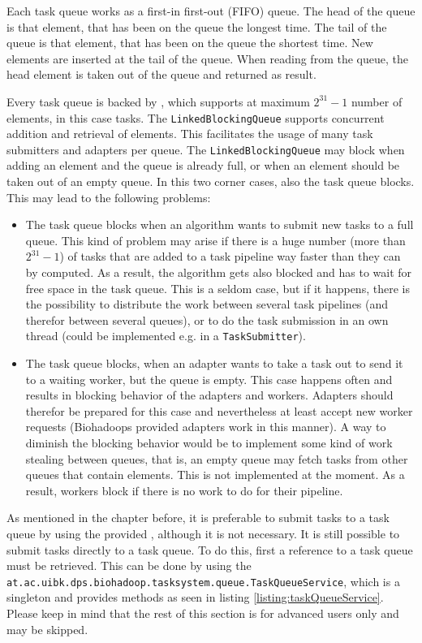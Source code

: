   Each task queue works as a first-in first-out (FIFO) queue. The head of the queue is that element, that has been on the queue the longest time. The tail of the queue is that element, that has been on the queue the shortest time. New elements are inserted at the tail of the queue. When reading from the queue, the head element is taken out of the queue and returned as result.
  
  Every task queue is backed by , which supports at maximum $2^{31} - 1$ number of elements, in this case tasks. The \texttt{LinkedBlockingQueue} supports concurrent addition and retrieval of elements. This facilitates the usage of many task submitters and adapters per queue. The \texttt{LinkedBlockingQueue} may block when adding an element and the queue is already full, or when an element should be taken out of an empty queue. In this two corner cases, also the task queue blocks. This may lead to the following problems:
  \begin{itemize}
    \item The task queue blocks when an algorithm wants to submit new tasks to a full queue. This kind of problem may arise if there is a huge number (more than $2^{31} - 1$) of tasks that are added to a task pipeline way faster than they can by computed. As a result, the algorithm gets also blocked and has to wait for free space in the task queue. This is a seldom case, but if it happens, there is the possibility to distribute the work between several task pipelines (and therefor between several queues), or to do the task submission in an own thread (could be implemented e.g. in a \texttt{TaskSubmitter}).
    \item The task queue blocks, when an adapter wants to take a task out to send it to a waiting worker, but the queue is empty. This case happens often and results in blocking behavior of the adapters and workers. Adapters should therefor be prepared for this case and nevertheless at least accept new worker requests (Biohadoops provided adapters work in this manner). A way to diminish the blocking behavior would be to implement some kind of work stealing between queues, that is, an empty queue may fetch tasks from other queues that contain elements. This is not implemented at the moment. As a result, workers block if there is no work to do for their pipeline.
  \end{itemize}
  
  As mentioned in the chapter before, it is preferable to submit tasks to a task queue by using the provided , although it is not necessary. It is still possible to submit tasks directly to a task queue. To do this, first a reference to a task queue must be retrieved. This can be done by using the \texttt{at.ac.uibk.dps.biohadoop.tasksystem.queue.TaskQueueService}, which is a singleton and provides methods as seen in listing \ref{listing:taskQueueService}. Please keep in mind that the rest of this section is for advanced users only and may be skipped.
  
